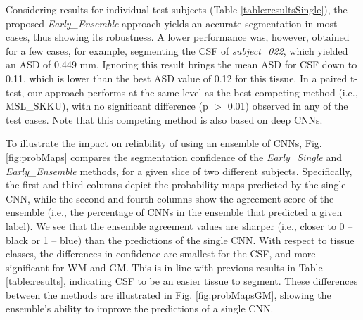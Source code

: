 \documentclass[twoside,espcrc2]{elsarticle}
\begin{document}
Considering results for individual test subjects (Table \ref{table:resultsSingle}), the proposed \textit{Early\_Ensemble} approach yields an accurate segmentation in most cases, thus showing its robustness. A lower performance was, however, obtained for a few cases, for example, segmenting the CSF of \textit{subject\_022}, which yielded an ASD of 0.449 mm. Ignoring this result brings the mean ASD for CSF down to 0.11, which is lower than the best ASD value of 0.12 for this tissue. 
In a paired t-test, 
our approach performs at the same level as the best competing method (i.e., MSL\_SKKU), with no significant difference (p $>$ 0.01) observed in any of the test cases. Note that this competing method is also based on deep CNNs. 


To illustrate the impact on reliability of using an ensemble of CNNs, Fig. \ref{fig:probMaps} compares the segmentation confidence of the \textit{Early\_Single} and \textit{Early\_Ensemble} methods, for a given slice of two different subjects. Specifically, the first and third columns depict the probability maps predicted by the single CNN, while the second and fourth columns show the agreement score of the ensemble (i.e., the percentage of CNNs in the ensemble that predicted a given label). We see that the ensemble agreement values are sharper (i.e., closer to 0 -- black or 1 -- blue) than the predictions of the single CNN. With respect to tissue classes, the differences in confidence are smallest for the CSF, and more significant for WM and GM. This is in line with previous results in Table \ref{table:results}, indicating CSF to be an easier tissue to segment. These differences between the methods are illustrated in Fig. \ref{fig:probMapsGM}, showing the ensemble's ability to improve the predictions of a single CNN. 
\end{document}
